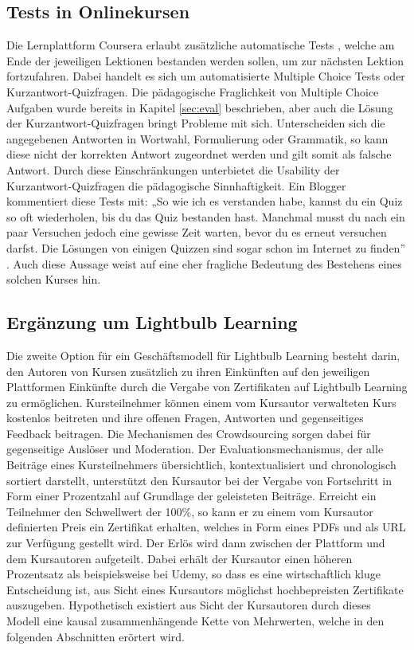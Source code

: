 \subsection{Tests in Onlinekursen}
\label{sub:coursera}
Die Lernplattform Coursera erlaubt zusätzliche automatische Tests \cite[vgl.][]{Coursera2022quiz}, welche am Ende der jeweiligen Lektionen bestanden werden sollen, um zur nächsten Lektion fortzufahren. Dabei handelt es sich um automatisierte Multiple Choice Tests oder Kurzantwort-Quizfragen. Die pädagogische Fraglichkeit von Multiple Choice Aufgaben wurde bereits in Kapitel \ref{sec:eval} beschrieben, aber auch die Lösung der Kurzantwort-Quizfragen bringt Probleme mit sich. Unterscheiden sich die angegebenen Antworten in Wortwahl, Formulierung oder Grammatik, so kann diese nicht der korrekten Antwort zugeordnet werden und gilt somit als falsche Antwort. Durch diese Einschränkungen unterbietet die Usability der Kurzantwort-Quizfragen die pädagogische Sinnhaftigkeit. Ein Blogger kommentiert diese Tests mit: „So wie ich es verstanden habe, kannst du ein Quiz so oft wiederholen, bis du das Quiz bestanden hast. Manchmal musst du nach ein paar Versuchen jedoch eine gewisse Zeit warten, bevor du es erneut versuchen darfst. Die Lösungen von einigen Quizzen sind sogar schon im Internet zu finden” \cite{Geier2022}. Auch diese Aussage weist auf eine eher fragliche Bedeutung des Bestehens eines solchen Kurses hin.

\subsection{Ergänzung um Lightbulb Learning}
Die zweite Option für ein Geschäftsmodell für Lightbulb Learning besteht darin, den Autoren von Kursen zusätzlich zu ihren Einkünften auf den jeweiligen Plattformen Einkünfte durch die Vergabe von Zertifikaten auf Lightbulb Learning zu ermöglichen. Kursteilnehmer können einem vom Kursautor verwalteten Kurs kostenlos beitreten und ihre offenen Fragen, Antworten und gegenseitiges Feedback beitragen. Die Mechanismen des Crowdsourcing sorgen dabei für gegenseitige Auslöser und Moderation. Der Evaluationsmechanismus, der alle Beiträge eines Kursteilnehmers übersichtlich, kontextualisiert und chronologisch sortiert darstellt, unterstützt den Kursautor bei der Vergabe von Fortschritt in Form einer Prozentzahl auf Grundlage der geleisteten Beiträge. Erreicht ein Teilnehmer den Schwellwert der 100\%, so kann er zu einem vom Kursautor definierten Preis ein Zertifikat erhalten, welches in Form eines PDFs und als URL zur Verfügung gestellt wird. Der Erlös wird dann zwischen der Plattform und dem Kursautoren aufgeteilt. Dabei erhält der Kursautor einen höheren Prozentsatz als beispielsweise bei Udemy, so dass es eine wirtschaftlich kluge Entscheidung ist, aus Sicht eines Kursautors möglichst hochbepreisten Zertifikate auszugeben. Hypothetisch existiert aus Sicht der Kursautoren durch dieses Modell eine kausal zusammenhängende Kette von Mehrwerten, welche in den folgenden Abschnitten erörtert wird.

